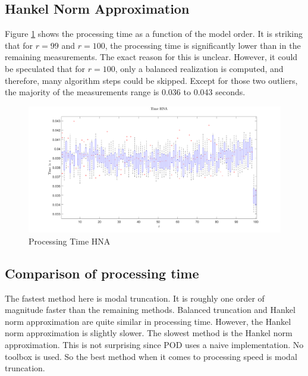 \subsection{Hankel Norm Approximation}
Figure \ref{FIG-T-HNA} shows the processing time as a function of the model order.
It is striking that for \(r = 99\) and \(r = 100\), the processing time is significantly lower than in the remaining measurements.
The exact reason for this is unclear. However, it could be speculated that for \(r=100\), only a balanced realization is computed, and therefore, many algorithm steps could be skipped.
Except for those two outliers, the majority of the measurements range is 0.036 to 0.043 seconds.
\begin{figure}[H]
\centering
\includegraphics[width=\textwidth]{images/time/HNA}
\caption{Processing Time HNA}
\label{FIG-T-HNA}
\end{figure}

\subsection{Comparison of processing time}
The fastest method here is modal truncation.
It is roughly one order of magnitude faster than the remaining methods.
Balanced truncation and Hankel norm approximation are quite similar in processing time. However, the Hankel norm approximation is slightly slower.
The slowest method is the Hankel norm approximation.
This is not surprising since POD uses a naive implementation. No toolbox is used.
So the best method when it comes to processing speed is modal truncation.










